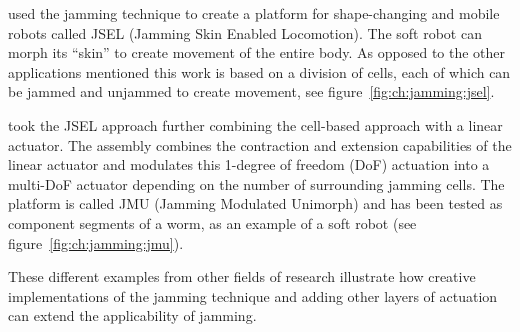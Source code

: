 \citet{steltz2009jsel} used the jamming technique to create a platform for shape-changing and mobile robots called JSEL (Jamming Skin Enabled Locomotion).
The soft robot can morph its ``skin'' to create movement of the entire body. 
As opposed to the other applications mentioned this work is based on a division of cells, each of which can be jammed and unjammed to create movement, see figure~\ref{fig:ch:jamming:jsel}. 

\citet{steltz2010jamming} took the JSEL approach further combining the cell-based approach with a linear actuator. 
The assembly combines the contraction and extension capabilities of the linear actuator and modulates this 1-degree of freedom (DoF) actuation into a multi-DoF actuator depending on the number of surrounding jamming cells.
The platform is called JMU (Jamming Modulated Unimorph) and has been tested as component segments of a worm, as an example of a soft robot (see figure~\ref{fig:ch:jamming:jmu}).

These different examples from other fields of research illustrate how creative implementations of the jamming technique and adding other layers of actuation can extend the applicability of jamming.

